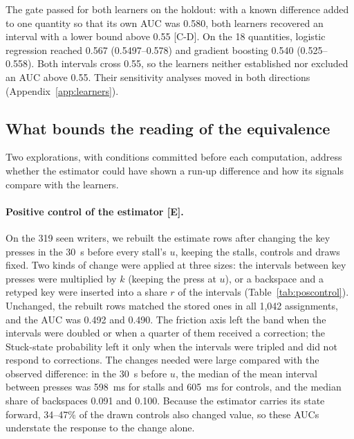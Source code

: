 The gate passed for both learners on the holdout: with a known difference added to one quantity so that its own AUC was
0.580, both learners recovered an interval with a lower bound above 0.55 [C-D]. On the 18 quantities, logistic
regression reached 0.567 (0.5497--0.578) and gradient boosting 0.540 (0.525--0.558). Both intervals cross 0.55, so the
learners neither established nor excluded an AUC above 0.55. Their sensitivity analyses moved in both directions
(Appendix~\ref{app:learners}).

\subsection{What bounds the reading of the equivalence}
\label{sec:res-bounds}

Two explorations, with conditions committed before each computation, address whether the estimator could have shown a
run-up difference and how its signals compare with the learners.

\paragraph{Positive control of the estimator [E].} On the 319 seen writers, we rebuilt the estimate rows after changing
the key presses in the 30~s before every stall's $u$, keeping the stalls, controls and draws fixed. Two kinds of change
were applied at three sizes: the intervals between key presses were multiplied by $k$ (keeping the press at $u$), or a
backspace and a retyped key were inserted into a share $r$ of the intervals (Table~\ref{tab:poscontrol}). Unchanged, the
rebuilt rows matched the stored ones in all 1,042 assignments, and the AUC was 0.492 and 0.490. The friction axis left the
band when the intervals were doubled or when a quarter of them received a correction; the Stuck-state probability left
it only when the intervals were tripled and did not respond to corrections. The changes needed were large compared with
the observed difference: in the 30~s before $u$, the median of the mean interval between presses was 598~ms for stalls
and 605~ms for controls, and the median share of backspaces 0.091 and 0.100. Because the estimator carries its state
forward, 34--47\% of the drawn controls also changed value, so these AUCs understate the response to the change alone.

